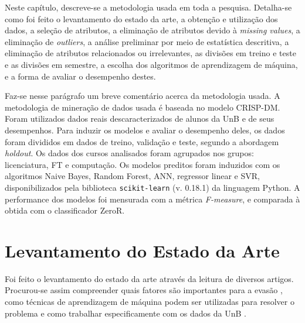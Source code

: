 Neste capítulo, descreve-se a metodologia usada em toda a pesquisa. 
Detalha-se como foi feito o levantamento
do estado da arte, a obtenção e utilização dos dados, a seleção de
atributos, a eliminação de atributos devido à \textit{missing values}, a eliminação
de \textit{outliers}, a análise preliminar por meio de estatística descritiva, a
eliminação de atributos relacionados ou irrelevantes, as divisões em treino e teste e
as divisões em semestre, a escolha dos algoritmos de aprendizagem de máquina, e a forma
de avaliar o desempenho destes.  
\par Faz-se nesse parágrafo um breve comentário acerca da metodologia usada. A
metodologia de mineração de dados usada é baseada no modelo CRISP-DM. Foram
utilizados dados reais descaracterizados de alunos da UnB e de seus desempenhos. Para
induzir os modelos e avaliar o desempenho deles, os dados foram divididos em dados de
treino, validação e teste, segundo a abordagem \textit{holdout}. Os dados dos cursos
analisados foram agrupados nos grupos: licenciatura, FT e computação. Os modelos
preditos foram induzidos com os algoritmos Naive Bayes, Random Forest, ANN, regressor
linear e SVR, disponibilizados pela biblioteca \texttt{scikit-learn} (v. 0.18.1) da linguagem
Python. A performance dos modelos foi mensurada com a métrica \textit{F-measure}, e
comparada à obtida com o classificador ZeroR. 


\section{Levantamento do Estado da Arte}
Foi feito o levantamento do estado da arte através da leitura de diversos artigos.
Procurou-se assim compreender
quais fatores são importantes para a evasão \cite{adeodato}
\cite{hoed_fatores} \cite{dropout_finland}, como técnicas de
aprendizagem de máquina podem ser utilizadas para resolver o problema \cite{adeodato}
 \cite{data_mining_retention} 
e como trabalhar especificamente com os dados da UnB \cite{manual_calouro} 
\cite{hoed_sobrevivencia}. 

